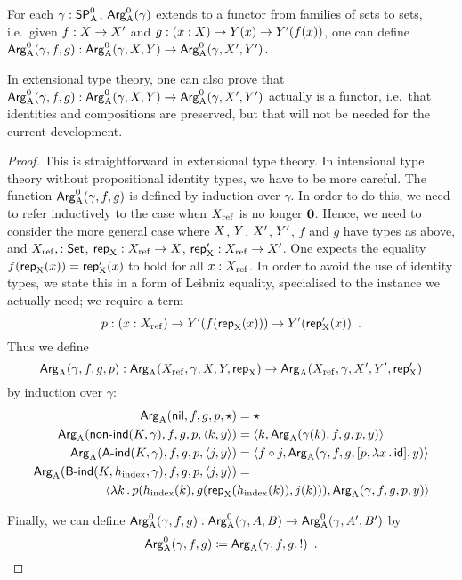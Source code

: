 \documentclass{schwicht}
\begin{document}
\begin{lemma}
  For each $\gamma : \SPAp$, $\ArgAp(\gamma)$ extends to a functor from
  families of sets to sets, i.e.\ given $f : \A \to \A'$ and $g : (x :
  \A) \to \B(x) \to \B'(f(x))$, one can define $\ArgAp(\gamma, f, g) :
  \ArgAp(\gamma, \A, \B) \to \ArgAp(\gamma, \A', \B')$.
\end{lemma}
\begin{remark}
  In extensional type theory, one can also prove that $\ArgAp(\gamma,
  f, g) : \ArgAp(\gamma, \A, \B) \to \ArgAp(\gamma, \A', \B')$
  actually is a functor, i.e.\ that identities and compositions are
  preserved, but that will not be needed for the current development.
\end{remark}
\begin{proof}
  This is straightforward in extensional type theory. In intensional
  type theory without propositional identity types, we have to be more
  careful. The function $\ArgAp(\gamma, f, g)$ is defined by induction
  over $\gamma$. In order to do this, we need to refer inductively to
  the case when $\Xref$ is no longer $\zero$. Hence, we need to
  consider the more general case where $\A$, $\B$, $\A'$, $\B'$, $f$
  and $g$ have types as above, and $\Xref, : \Set$, $\repA : \Xref \to
  \A$, $\repA' : \Xref \to \A'$. One expects the equality $f(\repA(x))
  = \repA'(x)$ to hold for all $x : \Xref$. In order to avoid the use
  of identity types, we state this in a form of Leibniz equality,
  specialised to the instance we actually need;  we require a term
  \[
  p : (x : \Xref) \to \B'(f(\repA(x))) \to \B'(\repA'(x)) \enspace .
  \]
  Thus we define
  \[
  \ArgA(\gamma, f, g, p) : %
  \ArgA(\Xref, \gamma, \A, \B, \repA)
  \to \ArgA(\Xref, \gamma, \A', \B', \repA')
  \]
  by induction over $\gamma$:
  \begin{align*}
    \ArgA(\nilA, f, g, p, \oneelt) &= \oneelt\\
    \ArgA(\nonindA(K, \gamma), f, g, p, \pair{k}{y}) &= \pair{k}{\ArgA(\gamma(k), f, g, p, y)}\\
    \ArgA(\AindA(K, \gamma), f, g, p, \pair{j}{y}) &= \pair{f \circ j}{\ArgA(\gamma, f, g, [p, \lambda x\,.\,\id], y)}\\
    \ArgA(\BindA(K, \hindex, \gamma), f, g, p, \pair{j}{y}) &= \\
    \pair{\lambda k\,.\,p(\hindex(k), g(\repA(&\hindex(k)), j(k)))}{\ArgA(\gamma, f, g, p, y)}
  \end{align*}
  
  Finally, we can define $\ArgAp(\gamma, f, g) : \ArgAp(\gamma, A, B) \to
  \ArgAp(\gamma, A', B')$ by
  \[
  \ArgAp(\gamma, f, g) \coloneqq \ArgA(\gamma,f, g, \magicOmit{B'(f(\repA(x))) \to B'(\repA'(x))}) \enspace . \qedhere
  \]
\end{proof}
\end{document}
